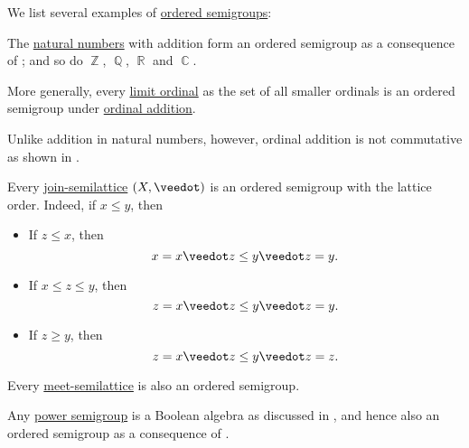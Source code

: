 \begin{example}\label{ex:def:ordered_semigroup}
  We list several examples of \hyperref[def:ordered_semigroup]{ordered semigroups}:

  \begin{thmenum}
     The \hyperref[def:natural_numbers]{natural numbers} with addition form an ordered semigroup as a consequence of ; and so do \( \BbbZ \), \( \BbbQ \), \( \BbbR \) and \( \BbbC \).

     More generally, every \hyperref[def:successor_and_limit_ordinal]{limit ordinal} as the set of all smaller ordinals is an ordered semigroup under \hyperref[def:ordinal_arithmetic/addition]{ordinal addition}.

    Unlike addition in natural numbers, however, ordinal addition is not commutative as shown in .

     Every \hyperref[def:semilattice]{join-semilattice} \( (X, \synvee) \) is an ordered semigroup with the lattice order. Indeed, if \( x \leq y \), then
    \begin{itemize}
      \item If \( z \leq x \), then
      \begin{equation*}
        x = x \synvee z \leq y \synvee z = y.
      \end{equation*}

      \item If \( x \leq z \leq y \), then
      \begin{equation*}
        z = x \synvee z \leq y \synvee z = y.
      \end{equation*}

      \item If \( z \geq y \), then
      \begin{equation*}
        z = x \synvee z \leq y \synvee z = z.
      \end{equation*}
    \end{itemize}

    Every \hyperref[def:semilattice]{meet-semilattice} is also an ordered semigroup.

     Any \hyperref[def:power_semigroup]{power semigroup} is a Boolean algebra as discussed in , and hence also an ordered semigroup as a consequence of .
  \end{thmenum}
\end{example}

